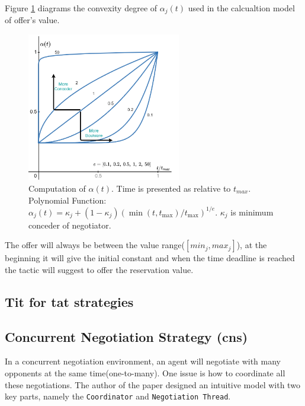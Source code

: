 Figure \ref{fig:boulware-conceder} diagrams the convexity degree of $\alpha_j(t)$ used in the calcualtion model of offer's value.

\begin{figure}[htbp]
\centering
\includegraphics[width=0.6\textwidth]{./images/boulware-conceder.png}
\caption{Computation of $\alpha(t)$. Time is presented as relative to $t_{max}$. Polynomial Function: $\alpha_{j}(t)=\kappa_{j}+\left(1-\kappa_{j}\right)\left(\min \left(t, t_{\max }\right) / t_{\max }\right)^{1 / e}$. $\kappa_{j}$ is minimum conceder of negotiator.}
\label{fig:boulware-conceder}
\end{figure}

The offer will always be between the value range($[min_j, max_j]$), at the beginning it will give the initial constant and when the time deadline is reached the tactic will suggest to offer the reservation value.


\subsection{Tit for tat strategies}

\subsection{Concurrent Negotiation Strategy (\gls{cns})}
In a concurrent negotiation environment, an agent will negotiate with many opponents at the same time(one-to-many). One issue is how to coordinate all these negotiations. The author of the paper \parencite{Williams12Concurrent} designed an intuitive model with two key parts, namely the \texttt{Coordinator} and
\texttt{Negotiation Thread}. 

